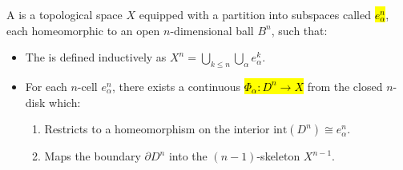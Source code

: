 \begin{definition} \label{definition:cellular_complex}
A  is a topological space $X$ equipped with a partition into subspaces called  \hl{$e_{\alpha}^n$}, each homeomorphic to an open $n$-dimensional ball $B^n$, such that:
\begin{itemize}
    \item The  is defined inductively as $X^n = \bigcup_{k \le n} \bigcup_{\alpha} e_{\alpha}^k$.
    \item For each $n$-cell $e_{\alpha}^n$, there exists a continuous  \hl{$\Phi_{\alpha}: D^n \to X$} from the closed $n$-disk which:
    \begin{enumerate}
        \item Restricts to a homeomorphism on the interior $\text{int}(D^n) \cong e_{\alpha}^n$.
        \item Maps the boundary $\partial D^n$ into the $(n-1)$-skeleton $X^{n-1}$.
    \end{enumerate}
\end{itemize}
\end{definition}